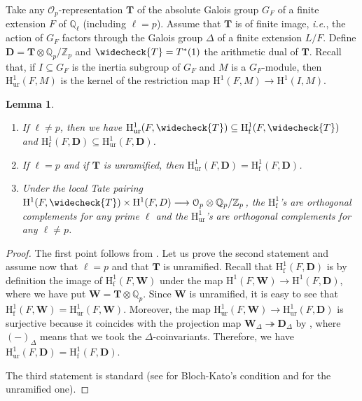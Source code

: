\documentclass[12pt]{amsart}
\newcommand\bQ{\mathbb{Q}}
\newcommand\Zp{{\mathbb{Z}_p}}
\newcommand\Qp{{\mathbb{Q}_p}}
\newcommand\cO{\mathcal{O}}
\newcommand{\HH}{\mathrm{H}}
\newcommand{\ff}{\mathrm{f}}
\newcommand{\ur}{\mathrm{ur}}
\theoremstyle{defstyle}
\theoremstyle{thmstyle}
\newtheorem{lemme}[subsubsection]{Lemma}
\begin{document}
Take any $\cO_p$-representation $\textbf{T}$ of the absolute Galois group $G_F$ of a finite extension $F$ of $\bQ_\ell$ (including $\ell=p$). Assume that $\textbf{T}$ is of finite image, \textit{i.e.}, the action of $G_F$ factors through the Galois group $\Delta$ of a finite extension $L/F$. Define $\textbf{D}=\textbf{T}\otimes \Qp/\Zp$ and $\widecheck{\textbf{T}}=\textbf{T}^*(1)$ the arithmetic dual of $\textbf{T}$. Recall that, if $I\subseteq G_F$ is the inertia subgroup of $G_F$ and $M$ is a $G_F$-module, then $\HH^1_\ur(F,M)$ is the kernel of the restriction map $\HH^1(F,M) \longrightarrow\HH^1(I,M)$.
\begin{lemme}\label{lem:comparaison_f_et_ur}\hspace{2em}
	\begin{enumerate}
		\item If $\ell \neq p$, then we have $\HH^1_\ur(F,\widecheck{\textbf{T}}) \subseteq \HH^1_\ff(F,\widecheck{\textbf{T}})$ and $\HH^1_\ff(F,{\textbf{D}}) \subseteq \HH^1_\ur(F,{\textbf{D}})$.
		\item If $\ell=p$ and if $\textbf{T}$ is unramified, then $\HH^1_\ur(F,\textbf{D})=\HH^1_\ff(F,{\textbf{D}})$.
		\item Under the local Tate pairing $\HH^1(F,\widecheck{\textbf{T}}) \times \HH^1(F,\textbf{D}) \longrightarrow \cO_p \otimes \Qp/\Zp$, the $\HH^1_\ff$'s are orthogonal complements for any prime $\ell$ and the $\HH^1_\ur$'s are orthogonal complements for any $\ell\neq p$.
	\end{enumerate}
\end{lemme}
\begin{proof}
The first point follows from \cite[Lem. 3.5]{rubinES}. Let us prove the second statement and assume now that $\ell=p$ and that $\textbf{T}$ is unramified. Recall that $\HH^1_\ff(F,\textbf{D})$ is by definition the image of $\HH^1_\ff(F,\textbf{W})$ under the map $\HH^1(F,\textbf{W})\longrightarrow \HH^1(F,\textbf{D})$, where we have put  $\textbf{W}=\textbf{T}\otimes \Qp$. Since $\textbf{W}$ is unramified, it is easy to see that $\HH^1_\ff(F,\textbf{W})=\HH^1_\ur(F,\textbf{W})$. Moreover, the map $\HH^1_\ur(F,\textbf{W}) \longrightarrow \HH^1_\ur(F,\textbf{D})$ is surjective because it coincides with the projection map $\textbf{W}_{\Delta} \twoheadrightarrow \textbf{D}_\Delta$ by \cite[Lem. 3.2.(i)]{rubinES}, where $(-)_\Delta$ means that we took the $\Delta$-coinvariants. Therefore, we have $\HH^1_\ur(F,\textbf{D})=\HH^1_\ff(F,{\textbf{D}})$. 

The third statement is standard (see \cite[Prop. 3.8]{blochkato} for Bloch-Kato's condition and \cite[Prop. 4.3.(i)]{rubinES} for the unramified one).
\end{proof}
\end{document}
